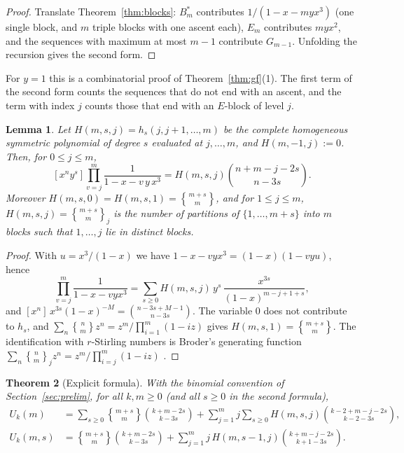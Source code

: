 \documentclass[11pt]{amsart}
\newtheorem{theorem}{Theorem}[section]
\newtheorem{lemma}[theorem]{Lemma}
\theoremstyle{definition}
\newcommand{\stirling}[2]{\genfrac{\{}{\}}{0pt}{}{#1}{#2}}
\newcommand{\rstirling}[3]{\genfrac{\{}{\}}{0pt}{}{#1}{#2}_{#3}}
\begin{document}
\begin{proof}
Translate Theorem~\ref{thm:blocks}: $B_m^*$ contributes $1/(1-x-myx^3)$ (one single block, and $m$ triple blocks with one ascent each), $E_m$ contributes $myx^2$, and the sequences with maximum at most $m-1$ contribute $G_{m-1}$. Unfolding the recursion gives the second form.
\end{proof}

For $y=1$ this is a combinatorial proof of Theorem~\ref{thm:gf}(1). The first term of the second form counts the sequences that do not end with an ascent, and the term with index $j$ counts those that end with an $E$-block of level $j$.

\begin{lemma}\label{lem:coef}
Let $H(m,s,j)=h_s(j,j+1,\dots,m)$ be the complete homogeneous symmetric polynomial of degree $s$ evaluated at $j,\dots,m$, and $H(m,-1,j):=0$. Then, for $0\le j\le m$,
\[
  [x^ny^s]\prod_{v=j}^{m}\frac{1}{1-x-v\,y\,x^3}=H(m,s,j)\binom{n+m-j-2s}{n-3s}.
\]
Moreover $H(m,s,0)=H(m,s,1)=\stirling{m+s}{m}$, and for $1\le j\le m$, $H(m,s,j)=\rstirling{m+s}{m}{j}$ is the number of partitions of $\{1,\dots,m+s\}$ into $m$ blocks such that $1,\dots,j$ lie in distinct blocks.
\end{lemma}

\begin{proof}
With $u=x^3/(1-x)$ we have $1-x-vyx^3=(1-x)(1-vyu)$, hence
\[
  \prod_{v=j}^{m}\frac{1}{1-x-vyx^3}=\sum_{s\ge0}H(m,s,j)\,y^s\,\frac{x^{3s}}{(1-x)^{m-j+1+s}},
\]
and $[x^n]\,x^{3s}(1-x)^{-M}=\binom{n-3s+M-1}{n-3s}$. The variable $0$ does not contribute to $h_s$, and $\sum_n\stirling{n}{m}z^n=z^m/\prod_{i=1}^{m}(1-iz)$ gives $H(m,s,1)=\stirling{m+s}{m}$. The identification with $r$-Stirling numbers is Broder's generating function $\sum_n\rstirling{n}{m}{j}z^n=z^m/\prod_{i=j}^{m}(1-iz)$ \cite{Broder}.
\end{proof}

\begin{theorem}[Explicit formula]\label{thm:explicit}
With the binomial convention of Section~\ref{sec:prelim}, for all $k,m\ge0$ (and all $s\ge0$ in the second formula),
\begin{align*}
  U_k(m)&=\sum_{s\ge0}\stirling{m+s}{m}\binom{k+m-2s}{k-3s}+\sum_{j=1}^{m}j\sum_{s\ge0}H(m,s,j)\binom{k-2+m-j-2s}{k-2-3s},\\
  U_k(m,s)&=\stirling{m+s}{m}\binom{k+m-2s}{k-3s}+\sum_{j=1}^{m}j\,H(m,s-1,j)\binom{k+m-j-2s}{k+1-3s}.
\end{align*}
\end{theorem}
\end{document}
